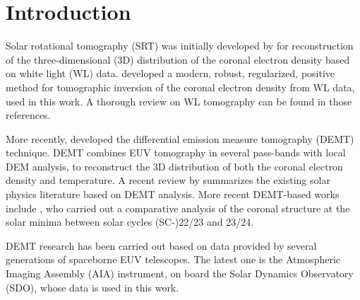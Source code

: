 \documentclass[baaa]{baaa}
\begin{document}

\maketitle

\section{Introduction}\label{intro}

Solar rotational tomography (SRT) was initially developed by \citet{altschuler_1972} for reconstruction of the three-dimensional (3D) distribution of the coronal electron density based on white light (WL) data. \citet{frazin_2002} developed a modern, robust, regularized, positive method for tomographic inversion of the coronal electron density from WL data, used in this work. A thorough review on WL tomography can be found in those references.

More recently, \citet{frazin_2009} developed the differential emission measure tomography (DEMT) technique. DEMT combines EUV tomography in several pass-bands with local DEM analysis, to reconstruct the 3D distribution of both the coronal electron density and temperature. A recent review by \citet{vasquez_2016} summarizes the existing solar physics literature based on DEMT analysis. More recent DEMT-based works include \citet{lloveras_2017}, who carried out a comparative analysis of the coronal structure at the solar minima between solar cycles (SC-)22/23 and 23/24.

DEMT research has been carried out based on data provided by several generations of spaceborne EUV telescopes. The latest one is the Atmospheric Imaging Assembly (AIA) instrument, on board the Solar Dynamics Observatory (SDO), whose data is used in this work.
\end{document}
